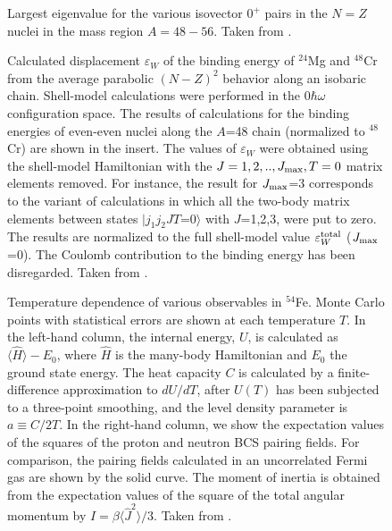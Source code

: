 \documentclass[rmp,preprint,aps,floatfix]{revtex4}
\begin{document}
\begin{figure}
\caption{Largest eigenvalue for the various isovector $0^+$ pairs
in the $N=Z$ nuclei in the mass region $A=48-56$. 
Taken from \cite{langanke97}.}
\label{fig_89}
\end{figure}


\begin{figure}
\caption{Calculated displacement $\varepsilon_W$ of the binding energy of 
$^{24}$Mg and $^{48}$Cr
from the average parabolic $(N-Z)^2$
behavior along an isobaric chain.
 Shell-model calculations were performed in the 
$0\hbar\omega$ configuration  space.
The results of 
calculations for the binding energies
of even-even nuclei
along  the $A$=48 chain (normalized to  $^{48}$Cr)
are shown in the insert.
The values of  $\varepsilon_W$ 
were obtained using the shell-model Hamiltonian
with
the $J=1,2,..,J_{\rm max}, T=0$ matrix elements removed.
For instance, the result for $J_{\rm  max}$=3
corresponds to the variant of calculations in which
all the two-body  matrix elements between states
$|j_1j_2 JT$=$0\rangle$ with $J$=1,2,3, were put to zero.   
The results are normalized to  
the full shell-model value 
$\varepsilon_W^{\rm total}$ ($J_{\rm  max}$=0). 
The Coulomb contribution to the binding energy has been 
disregarded. Taken from  \protect\cite{Sat97}.
\label{satula_pn}}
\end{figure}


\begin{figure}
\caption{Temperature dependence of various observables in ${}^{54}$Fe. Monte
Carlo points with statistical errors are shown at each temperature $T$. In
the left-hand column, the internal energy, $U$,
is calculated as $\langle {\hat H}
\rangle -E_0$, where ${\hat H}$ is the many-body Hamiltonian and $E_0$ the
ground state energy. The heat capacity $C$ is calculated by a finite-difference
approximation to $dU/dT$, after $U(T)$ has been subjected to a three-point
smoothing, and the level density parameter is $a\equiv C/2T$.
In the right-hand column, we show the expectation values of the
squares of the proton and neutron BCS pairing fields.
For comparison, the pairing fields
calculated in an uncorrelated Fermi gas are shown by the solid curve. The
moment of inertia is obtained from the expectation values of the square of
the total angular momentum by $I=\beta \langle {\hat J}^2 \rangle/3$.
Taken from  \protect\cite{Dean95}. \label{fig_810}}
\end{figure}
\end{document}
